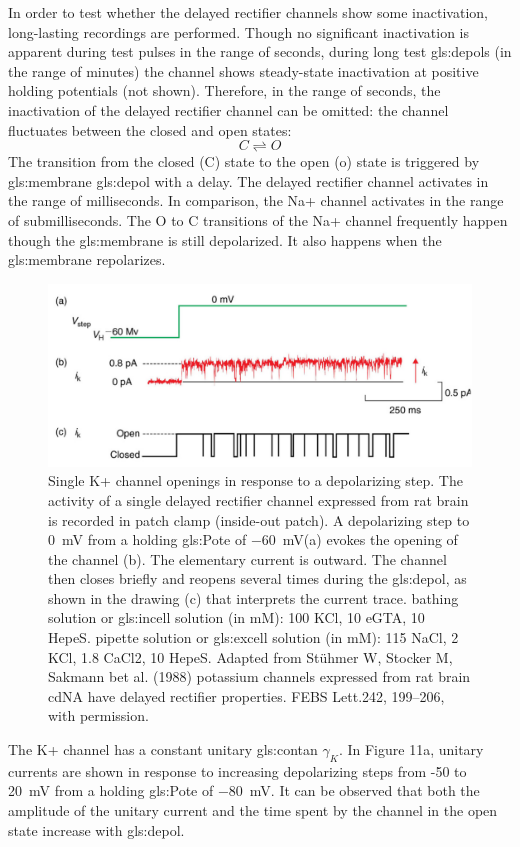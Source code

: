 \documentclass[class={myRUCProject}, crop=false]{standalone}
\begin{document}
In order to test whether the delayed rectifier channels show some inactivation, long-lasting recordings are performed. Though no significant inactivation is apparent during test pulses in the range of seconds, during long test \glspl{gls:depol} (in the range of minutes) the channel shows steady-state inactivation at positive holding potentials (not shown). Therefore, in the range of seconds, the inactivation of the delayed rectifier channel can be omitted: the channel fluctuates between the closed and open states:
\[C\rightleftharpoons O\]
The transition from the closed (C) state to the open (o) state is triggered by \gls{gls:membrane} \gls{gls:depol} with a delay. The delayed rectifier channel activates in the range of milliseconds. In comparison, the Na+ channel activates in the range of submilliseconds. The O to C transitions of the Na+ channel frequently happen though the \gls{gls:membrane} is still depolarized. It also happens when the \gls{gls:membrane} repolarizes. 
 \begin{figure}[H]
   \centering
   \includegraphics[width=0.5\linewidth]{Pictures//Anakin/K+channel.png}
   \caption{Single K+ channel openings in response to a depolarizing step. The activity of a single delayed rectifier channel expressed from rat brain is recorded in patch clamp (inside-out patch). A depolarizing step to \qty{0}{\mV} from a holding \gls{gls:Pote} of \qty{-60}{\mV}(a) evokes the opening of the channel (b). The elementary current is outward. The channel then closes briefly and reopens several times during the \gls{gls:depol}, as shown in the drawing (c) that interprets the current trace. bathing solution or \gls{gls:incell} solution (in mM): 100 KCl, 10 eGTA, 10 HepeS. pipette solution or \gls{gls:excell} solution (in mM): 115 NaCl, 2 KCl, 1.8 CaCl2, 10 HepeS. Adapted from Stühmer W, Stocker M, Sakmann bet al. (1988) potassium channels expressed from rat brain cdNA have delayed rectifier properties. FEBS Lett.242, 199–206, with permission. }
   \label{fig:enter-label}
 \end{figure}

The K+ channel has a constant unitary \gls{gls:contan} \(\gamma_K\). In Figure 11a, unitary currents are shown in response to increasing depolarizing steps from -50 to \qty{20}{\mV} from a holding \gls{gls:Pote} of \qty{-80}{\mV}. It can be observed that both the amplitude of the unitary current and the time spent by the channel in the open state increase with \gls{gls:depol}. 
\end{document}

